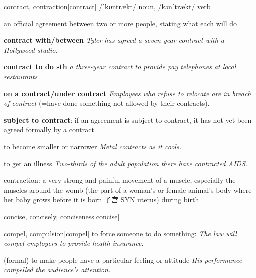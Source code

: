 \begin{DefWord}{contract, contraction}[contract]
    /ˈkɒntrækt/ noun, /kənˈtrækt/ verb

    an official agreement between two or more people, stating what each will do

    \textbf{contract with/between}
    \textit{Tyler has agreed a seven-year contract with a Hollywood studio.}

    \textbf{contract to do sth}
    \textit{a three-year contract to provide pay telephones at local restaurants}

    \textbf{on a contract/under contract}
    \textit{Employees who refuse to relocate are in breach of contract} (=have done something not allowed by their contracts).


    \textbf{subject to contract}: if an agreement is subject to contract, it has not yet been agreed formally by a contract

    to become smaller or narrower
    \textit{Metal contracts as it cools.}

    to get an illness
    \textit{Two-thirds of the adult population there have contracted AIDS.}

    contraction: a very strong and painful movement of a muscle, especially the muscles around the womb (the part of a woman's or female animal's body where her baby grows before it is born 子宫 SYN  uterus) during birth
\end{DefWord}

\begin{DefWord}{concise, concisely, conciseness}[concise] 
\end{DefWord}

\begin{DefWord}{compel,  compulsion}[compel]
    to force someone to do something:
    \textit{The law will compel employers to provide health insurance.}

    (formal) to make people have a particular feeling or attitude
    \textit{His performance compelled the audience's attention.}
\end{DefWord}


